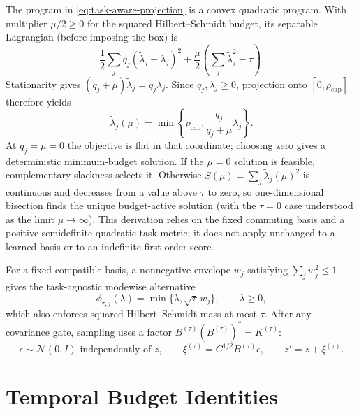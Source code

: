 The program in \cref{eq:task-aware-projection} is a convex quadratic program.
With multiplier $\mu/2\ge0$ for the squared Hilbert--Schmidt budget, its
separable Lagrangian (before imposing the box) is
\begin{equation}
  \frac12\sum_j q_j(\widetilde\lambda_j-\lambda_j)^2
  +\frac\mu2\left(\sum_j\widetilde\lambda_j^2-\tau\right).
\end{equation}
Stationarity gives
$(q_j+\mu)\widetilde\lambda_j=q_j\lambda_j$. Since
$q_j,\lambda_j\ge0$, projection onto $[0,\rho_{\mathrm{cap}}]$ therefore yields
\begin{equation}
  \widetilde\lambda_j(\mu)
  =\min\!\left\{\rho_{\mathrm{cap}},
    \frac{q_j}{q_j+\mu}\lambda_j
  \right\}.
\end{equation}
At $q_j=\mu=0$ the objective is flat in that coordinate; choosing zero gives
a deterministic minimum-budget solution. If the $\mu=0$ solution is
feasible, complementary slackness selects it. Otherwise
$S(\mu)=\sum_j\widetilde\lambda_j(\mu)^2$ is continuous and decreases from a
value above $\tau$ to zero, so one-dimensional bisection finds the unique
budget-active solution (with the $\tau=0$ case understood as the limit
$\mu\to\infty$). This derivation relies on the fixed commuting basis and a
positive-semidefinite quadratic task metric; it does not apply unchanged to
a learned basis or to an indefinite first-order score.

For a fixed compatible basis, a nonnegative envelope $w_j$ satisfying
$\sum_jw_j^2\le1$ gives the task-agnostic modewise alternative
\begin{equation}
  \phi_{\tau,j}(\lambda)
  =\min\{\lambda,\sqrt\tau\,w_j\},
  \qquad \lambda\ge0,
  \label{eq:envelope-gate}
\end{equation}
which also enforces squared Hilbert--Schmidt mass at most $\tau$. After any
covariance gate, sampling uses a factor
$B^{(\tau)}(B^{(\tau)})^\ast=K^{(\tau)}$:
\begin{equation}
  \epsilon\sim\mathcal N(0,I)\text{ independently of }z,\qquad
  \xi^{(\tau)}=C^{1/2}B^{(\tau)}\epsilon,\qquad
  z'=z+\xi^{(\tau)}.
  \label{eq:noise-layer-interface}
\end{equation}


\section{Temporal Budget Identities}
\label{app:temporal-budgets}


